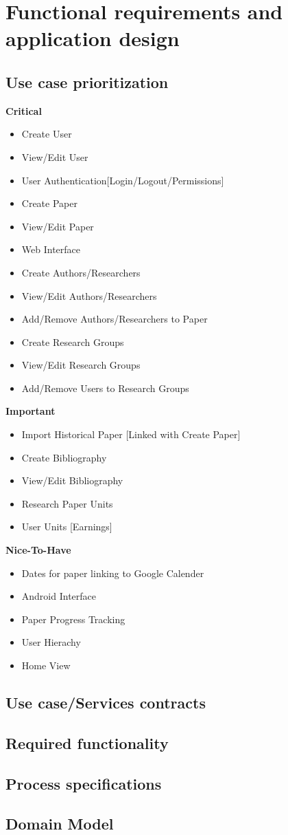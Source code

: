 \documentclass[a4paper,10pt]{article}
\begin{document}
\section{Functional requirements and application design}

\subsection{Use case prioritization}
\textbf{Critical}
\begin{itemize}
  	\item Create User
	\item View/Edit User
	\item User Authentication[Login/Logout/Permissions]
	\item Create Paper
	\item View/Edit Paper
	\item Web Interface
	\item Create Authors/Researchers
	\item View/Edit Authors/Researchers
	\item Add/Remove Authors/Researchers to Paper
	\item Create Research Groups
	\item View/Edit Research Groups
	\item Add/Remove Users to Research Groups
\end{itemize}

\textbf{Important}
\begin{itemize}
  	\item Import Historical Paper [Linked with Create Paper]
	\item Create Bibliography
	\item View/Edit Bibliography
	\item Research Paper Units
	\item User Units [Earnings]
\end{itemize}

\textbf{Nice-To-Have}
\begin{itemize}
	\item Dates for paper linking to Google Calender
	\item Android Interface
	\item Paper Progress Tracking
	\item User Hierachy
	\item Home View
\end{itemize}

\subsection{Use case/Services contracts}
\subsection{Required functionality}
\subsection{Process specifications}
\subsection{Domain Model}
\end{document}
